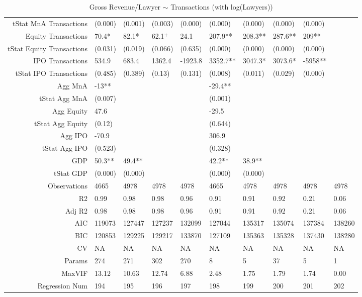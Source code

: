\begin{table}[ht]
\begin{tabular}{rlllllllll}
  tStat MnA Transactions & (0.000) & (0.001) & (0.003) & (0.000) & (0.000) & (0.000) & (0.000) & (0.000) &  \\ 
  Equity Transactions & 70.4* & 82.1* & 62.1$^{+}$ & 24.1 & 207.9** & 208.3** & 287.6** & 209** &  \\ 
  tStat Equity Transactions & (0.031) & (0.019) & (0.066) & (0.635) & (0.000) & (0.000) & (0.000) & (0.000) &  \\ 
  IPO Transactions & 534.9 & 683.4 & 1362.4 & -1923.8 & 3352.7** & 3047.3* & 3073.6* & -5958** &  \\ 
  tStat IPO Transactions & (0.485) & (0.389) & (0.13) & (0.131) & (0.008) & (0.011) & (0.029) & (0.000) &  \\ 
  Agg MnA & -13** &  &  &  & -29.4** &  &  &  &  \\ 
  tStat Agg MnA & (0.007) &  &  &  & (0.001) &  &  &  &  \\ 
  Agg Equity & 47.6 &  &  &  & -29.5 &  &  &  &  \\ 
  tStat Agg Equity & (0.12) &  &  &  & (0.644) &  &  &  &  \\ 
  Agg IPO & -70.9 &  &  &  & 306.9 &  &  &  &  \\ 
  tStat Agg IPO & (0.523) &  &  &  & (0.328) &  &  &  &  \\ 
  GDP & 50.3** & 49.4** &  &  & 42.2** & 38.9** &  &  &  \\ 
  tStat GDP & (0.000) & (0.000) &  &  & (0.000) & (0.000) &  &  &  \\ 
  Observations & 4665 & 4978 & 4978 & 4978 & 4665 & 4978 & 4978 & 4978 & 4978 \\ 
  R2 & 0.99 & 0.98 & 0.98 & 0.96 & 0.91 & 0.91 & 0.92 & 0.21 & 0.06 \\ 
  Adj R2 & 0.98 & 0.98 & 0.98 & 0.96 & 0.91 & 0.91 & 0.92 & 0.21 & 0.06 \\ 
  AIC & 119073 & 127447 & 127237 & 132099 & 127044 & 135317 & 135074 & 137384 & 138260 \\ 
  BIC & 120853 & 129225 & 129217 & 133870 & 127109 & 135363 & 135328 & 137430 & 138280 \\ 
  CV & NA & NA & NA & NA & NA & NA & NA & NA & NA \\ 
  Params & 274 & 271 & 302 & 270 & 8 & 5 & 37 & 5 & 1 \\ 
  MaxVIF & 13.12 & 10.63 & 12.74 & 6.88 & 2.48 & 1.75 & 1.79 & 1.74 & 0.00 \\ 
  Regression Num & 194 & 195 & 196 & 197 & 198 & 199 & 200 & 201 & 202 \\ 
   \hline
\end{tabular}
\caption{Gross Revenue/Lawyer $\sim$ Transactions (with log(Lawyers))} 
\end{table}
